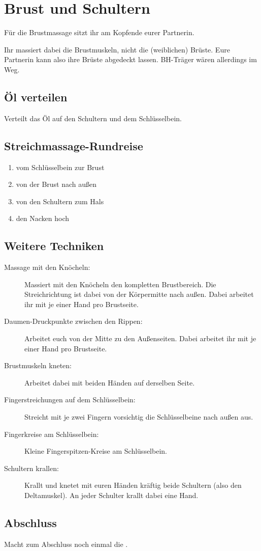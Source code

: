 \section{Brust und Schultern}
\enlargethispage{1em}

Für die Brustmassage sitzt ihr am Kopfende eurer Partnerin.

Ihr massiert dabei die Brustmuskeln, nicht die (weiblichen) Brüste. Eure Partnerin kann also ihre Brüste abgedeckt lassen. BH-Träger wären allerdings im Weg.

\subsection{Öl verteilen}
Verteilt das Öl auf den Schultern und dem Schlüsselbein.

\subsection{Streichmassage-Rundreise}

\begin{oframed}
  \begin{enumerate}
    \item vom Schlüsselbein zur Brust
    \item von der Brust nach außen
    \item von den Schultern zum Hals
    \item den Nacken hoch
  \end{enumerate}
\end{oframed}

\subsection{Weitere Techniken}
\begin{description}
  \item [Massage mit den Knöcheln:] Massiert mit den Knöcheln den kompletten Brustbereich. Die Streichrichtung ist dabei von der Körpermitte nach außen. Dabei arbeitet ihr mit je einer Hand pro Brustseite.
  \item [Daumen-Druckpunkte zwischen den Rippen:] Arbeitet euch von der Mitte zu den Außenseiten. Dabei arbeitet ihr  mit je einer Hand pro Brustseite.
  \item [Brustmuskeln kneten:] Arbeitet dabei mit beiden Händen auf derselben Seite.
  \item [Fingerstreichungen auf dem Schlüsselbein:] Streicht mit je zwei Fingern vorsichtig die Schlüsselbeine nach außen aus.
  \item [Fingerkreise am Schlüsselbein:] Kleine Fingerspitzen-Kreise am Schlüsselbein.
  \item [Schultern krallen:] Krallt und knetet mit euren Händen kräftig  beide Schultern (also den Deltamuskel). An jeder Schulter krallt dabei eine Hand.
\end{description}

\subsection{Abschluss}

Macht zum Abschluss noch einmal die .

